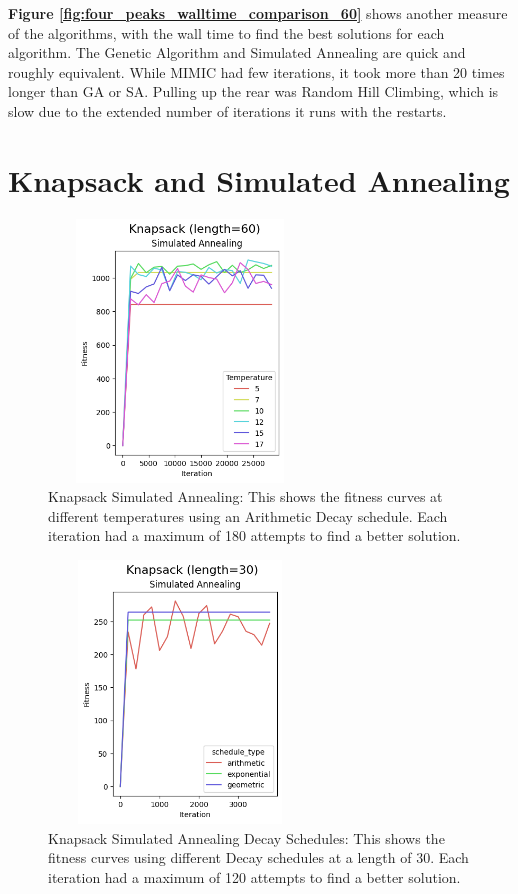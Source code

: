\documentclass[letterpaper]{article} %
\begin{document}
\textbf{Figure \ref{fig:four_peaks_walltime_comparison_60}} shows another measure of the algorithms, with the wall time to find the best solutions for each algorithm.  The Genetic Algorithm and Simulated Annealing are quick and roughly equivalent.  While MIMIC had few iterations, it took more than 20 times longer than GA or SA.  Pulling up the rear was Random Hill Climbing, which is slow due to the extended number of iterations it runs with the restarts.

\section{Knapsack and Simulated Annealing}
\begin{figure}[!htb]
\centering
\includegraphics[width=2.75in, height=2.75in]{figures/Knapsack_length=60_Simulated_Annealing_l_60_ma_180_d_arith_t_5__7__10__12__15__17_.png}
\caption{Knapsack Simulated Annealing: This shows the fitness curves at different temperatures using an Arithmetic Decay schedule. Each iteration had a maximum of 180 attempts to find a better solution. }
\label{fig:knapsack_sa}
\end{figure}

\begin{figure}[!htb]
\centering
\includegraphics[width=2.75in, height=2.75in]{figures/Knapsack_length=30_Simulated_Annealing_l_30_ma_120_d_geom__arith__exp_t_10_.png}
\caption{Knapsack Simulated Annealing Decay Schedules: This shows the fitness curves using different Decay schedules at a length of 30. Each iteration had a maximum of 120 attempts to find a better solution. }
\label{fig:knapsack_sa_decay}
\end{figure}
\end{document}
